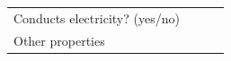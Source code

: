 \begin{enumerate}[noitemsep, label=\textbf{\arabic*}. ]
{{\begin{center}
\begin{xtabular}[t]{|l|l|l|l|}
     \tabularnewline{}
    
    
        Conducts electricity? (yes/no) &
    
    
         &
    
    
         &
    
    
     \tabularnewline{}
    
    
        Other properties &
    
    
         &
    
    
         &
    
    

\end{xtabular}
\end{center}}}
\end{enumerate}
